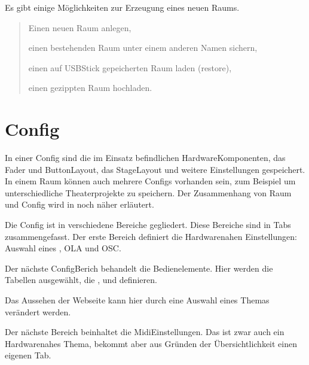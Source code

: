 \documentclass[letterpaper,10pt,ngerman]{sphinxmanual}
\begin{document}
Es gibt einige Möglichkeiten zur Erzeugung eines neuen Raums.
\begin{quote}

Einen neuen Raum anlegen,

einen bestehenden Raum unter einem anderen Namen sichern,

einen auf USB\sphinxhyphen{}Stick gepeicherten Raum laden (restore),

einen gezippten Raum hochladen.
\end{quote}

\noindent{}


\section{Config}
\label{\detokenize{einrichten:config}}\label{\detokenize{einrichten:configsetup}}
In einer Config sind die im Einsatz befindlichen Hardware\sphinxhyphen{}Komponenten, das
Fader\sphinxhyphen{} und Button\sphinxhyphen{}Layout, das Stage\sphinxhyphen{}Layout und weitere Einstellungen
gespeichert. In einem Raum können auch mehrere Configs vorhanden sein, zum
Beispiel um unterschiedliche Theaterprojekte zu speichern. Der Zusammenhang
von Raum und Config wird in
{\hyperref[\detokenize{grundlagen:raum-config-label}]{}} noch näher erläutert.

Die Config ist in verschiedene Bereiche gegliedert. Diese Bereiche sind in
Tabs zusammengefasst. Der erste Bereich definiert die Hardware\sphinxhyphen{}nahen
Einstellungen: Auswahl eines
{\hyperref[\detokenize{patch:patchlabel}]{}}, OLA und OSC.

\noindent{}

Der nächste Config\sphinxhyphen{}Berich behandelt die Bedienelemente. Hier werden die
Tabellen ausgewählt, die {\hyperref[\detokenize{einrichten:stage}]{}}, {\hyperref[\detokenize{einrichten:fader}]{}} und {\hyperref[\detokenize{einrichten:buttons}]{}} definieren.

Das Aussehen der Webseite kann hier durch eine Auswahl eines Themas
verändert werden.

\noindent{}

Der nächste Bereich beinhaltet die Midi\sphinxhyphen{}Einstellungen. Das ist zwar auch
ein Hardware\sphinxhyphen{}nahes Thema, bekommt aber aus Gründen der Übersichtlichkeit
einen eigenen Tab.
\end{document}
